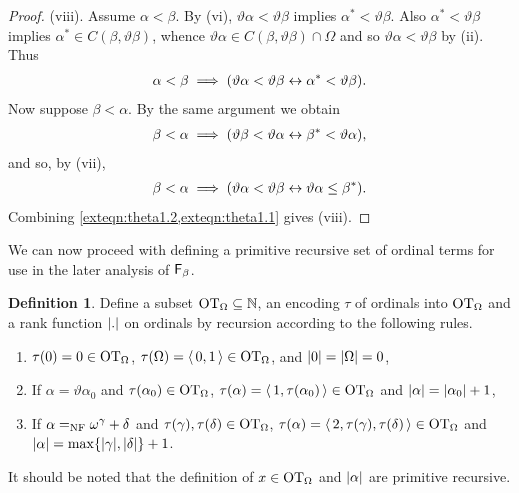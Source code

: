 \documentclass[UKenglish,cleveref,DIV=12]{scrartcl}
\theoremstyle{definition}
\newtheorem{definition}[lemma]{Definition}
\theoremstyle{definition}
\begin{document}
\begin{proof}
(viii). Assume $\alpha<\beta$. By (vi), $\vartheta\alpha<\vartheta\beta$ implies $\alpha^*<\vartheta\beta$. Also $\alpha^*<\vartheta\beta$ implies $\alpha^*\in C(\beta,\vartheta\beta)$, whence $\vartheta\alpha\in C(\beta,\vartheta\beta)\cap \Omega$ and so $\vartheta\alpha<\vartheta\beta$ by (ii). Thus
\begin{align}\label{exteqn:theta1.1}
 \alpha<\beta\implies(\vartheta\alpha<\vartheta\beta \leftrightarrow \alpha^*<\vartheta\beta).
\end{align}
Now suppose $\beta<\alpha$. By the same argument we obtain
\begin{align*}
 \beta<\alpha \implies(\vartheta\beta<\vartheta\alpha \leftrightarrow \beta^*<\vartheta\alpha),
\end{align*}
and so, by (vii),
\begin{align}\label{exteqn:theta1.2}
 \beta<\alpha \implies(\vartheta\alpha<\vartheta\beta \leftrightarrow \vartheta\alpha\le\beta^*).
\end{align}
Combining \cref{exteqn:theta1.2,exteqn:theta1.1} gives (viii).
%
\end{proof}
We can now proceed with defining a primitive recursive set of ordinal terms for
use in the later analysis of $\mathsf{F}_\beta$.
\begin{definition} Define a subset $\mathrm{OT}_\Omega\subseteq\mathbb N$, an encoding $\tau$
of ordinals into $\mathrm{OT}_\Omega$ and a rank function $\lvert{.}\rvert$ on ordinals by
recursion according to the following rules.
\begin{enumerate}%
 \item $\tau(0)=0\in\mathrm{OT}_\Omega$, $\tau(\Omega)=\langle\,0,1\,\rangle\in\mathrm{OT}_\Omega$, and $\lvert{0}\rvert=\lvert{\Omega}\rvert=0$,
 \item If $\alpha=\vartheta\alpha_0$ and $\tau(\alpha_0)\in\mathrm{OT}_\Omega$, $\tau(\alpha)=\langle\,1,\tau(\alpha_0)\,\rangle\in\mathrm{OT}_\Omega$ and $\lvert{\alpha}\rvert=\lvert{\alpha_0}\rvert+1$,
 \item If $\alpha=_{\mathrm{NF}}\omega^\gamma+\delta$ and $\tau(\gamma),\tau(\delta)\in\mathrm{OT}_\Omega$, $\tau(\alpha)=\langle\,2,\tau(\gamma),\tau(\delta)\,\rangle\in\mathrm{OT}_\Omega$ and $\lvert{\alpha}\rvert=\max\{\lvert{\gamma}\rvert,\lvert{\delta}\rvert\}+1$.
\end{enumerate}
\end{definition}
It should be noted that the definition of $x\in\mathrm{OT}_\Omega$ and $\lvert{\alpha}\rvert$ are primitive recursive.
\end{document}

